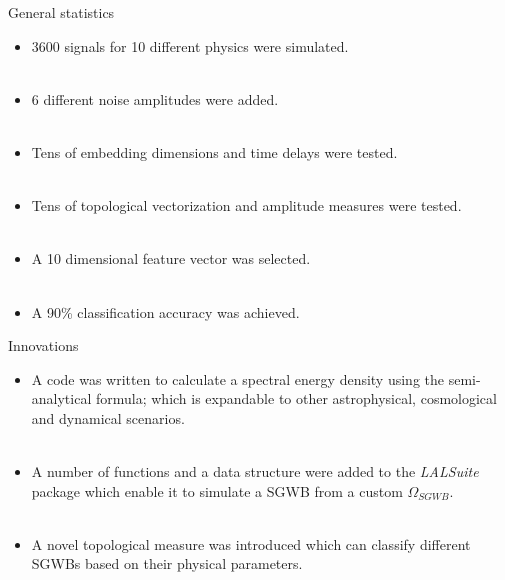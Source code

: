 \begin{frame}{General statistics}
\begin{itemize}[<+->]
	\item 3600 signals for 10 different physics were simulated.\\~\\
	\item 6 different noise amplitudes were added.\\~\\
	\item Tens of embedding dimensions and time delays were tested.\\~\\
	\item Tens of topological vectorization and amplitude measures were tested.\\~\\
	\item A 10 dimensional feature vector was selected.\\~\\
	\item A 90\% classification accuracy was achieved.
\end{itemize}
\end{frame}

\begin{frame}{Innovations}
\begin{itemize}[<+->]
	\item A code was written to calculate a spectral energy density using the semi-analytical formula; which is expandable to other astrophysical, cosmological and dynamical scenarios.\\~\\
	\item A number of functions and a data structure were added to the \textit{LALSuite} package which enable it to simulate a SGWB from a custom $\Omega_{SGWB}$.\\~\\
	\item A novel topological measure was introduced which can classify different SGWBs based on their physical parameters.
\end{itemize}
\end{frame}

